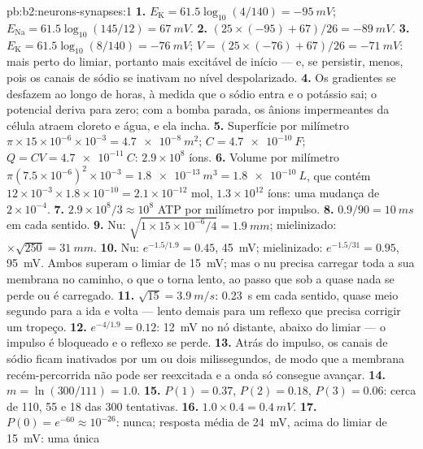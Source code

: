 \begin{solution}{pb:b2:neurons-synapses:1}
\textbf{1.} $E_{\mathrm K} = 61.5\log_{10}(4/140) = \qty{-95}{mV}$;
$E_{\mathrm{Na}} = 61.5\log_{10}(145/12) = \qty{+67}{mV}$.
\textbf{2.} $(25\times(-95) + 67)/26 = \qty{-89}{mV}$.
\textbf{3.} $E_{\mathrm K} = 61.5\log_{10}(8/140) = \qty{-76}{mV}$;
$V = (25\times(-76) + 67)/26 = \qty{-71}{mV}$: mais perto do limiar,
portanto mais excitável de início --- e, se persistir, menos, pois os
canais de sódio se inativam no nível despolarizado.
\textbf{4.} Os gradientes se desfazem ao longo de horas, à medida que o
sódio entra e o potássio sai; o potencial deriva para zero; com a bomba
parada, os ânions impermeantes da célula atraem cloreto e água, e ela
incha.
\textbf{5.} Superfície por milímetro $\pi\times 15\times 10^{-6}\times
10^{-3} = \qty{4.7e-8}{m^2}$; $C = \qty{4.7e-10}{F}$; $Q = CV =
\qty{4.7e-11}{C}$: $2.9\times 10^{8}$ íons.
\textbf{6.} Volume por milímetro $\pi(7.5\times 10^{-6})^{2}\times
10^{-3} = \qty{1.8e-13}{m^3} = \qty{1.8e-10}{L}$, que contém $12\times
10^{-3}\times 1.8\times 10^{-10} = 2.1\times 10^{-12}$ mol, $1.3\times
10^{12}$ íons: uma mudança de $2\times 10^{-4}$.
\textbf{7.} $2.9\times 10^{8}/3 \approx 10^{8}$ ATP por milímetro por
impulso.
\textbf{8.} $0.9/90 = \qty{10}{ms}$ em cada sentido.
\textbf{9.} Nu: $\sqrt{1\times 15\times 10^{-6}/4} = \qty{1.9}{mm}$;
mielinizado: $\times\sqrt{250} = \qty{31}{mm}$.
\textbf{10.} Nu: $e^{-1.5/1.9} = 0.45$, \qty{45}{mV}; mielinizado:
$e^{-1.5/31} = 0.95$, \qty{95}{mV}. Ambos superam o limiar de
\qty{15}{mV}; mas o  nu precisa carregar toda a sua membrana no
caminho, o que o torna lento, ao passo que sob a  quase nada se
perde ou é carregado.
\textbf{11.} $\sqrt{15} = \qty{3.9}{m/s}$: \qty{0.23}{s} em cada
sentido, quase meio segundo para a ida e volta --- lento demais para um
reflexo que precisa corrigir um tropeço.
\textbf{12.} $e^{-4/1.9} = 0.12$: \qty{12}{mV} no nó distante, abaixo do
limiar --- o impulso é bloqueado e o reflexo se perde.
\textbf{13.} Atrás do impulso, os canais de sódio ficam inativados por
um ou dois milissegundos, de modo que a membrana recém-percorrida não
pode ser reexcitada e a onda só consegue avançar.
\textbf{14.} $m = \ln(300/111) = 1.0$.
\textbf{15.} $P(1) = 0.37$, $P(2) = 0.18$, $P(3) = 0.06$: cerca de 110,
55 e 18 das 300 tentativas.
\textbf{16.} $1.0\times 0.4 = \qty{0.4}{mV}$.
\textbf{17.} $P(0) = e^{-60} \approx 10^{-26}$: nunca; resposta média
de \qty{24}{mV}, acima do limiar de \qty{15}{mV}: uma única 

\end{solution}
